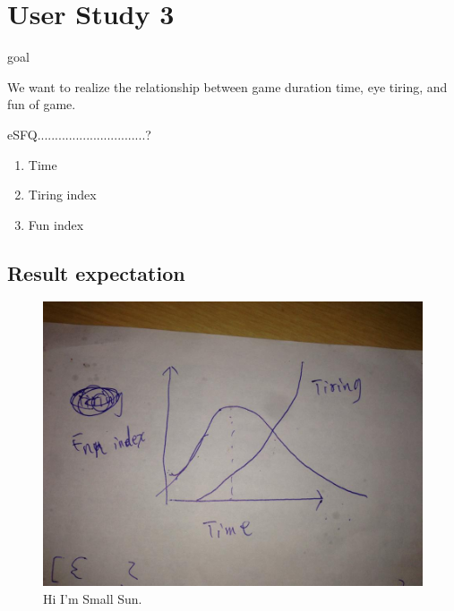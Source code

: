 \section{User Study 3}
goal

We want to realize the relationship between game duration time, eye tiring, and fun of game.

eSFQ...............................?
\begin{enumerate}
\item Time
\item Tiring index 
\item Fun index
\end{enumerate}

\subsection{Result expectation}

\begin{figure}[!t]
\centering
\includegraphics[width=0.9\columnwidth]{Figures/US3_tiringAndFun.jpg}
\caption{Hi I'm Small Sun.}
\label{fig:PS_Frus}
\end{figure}
